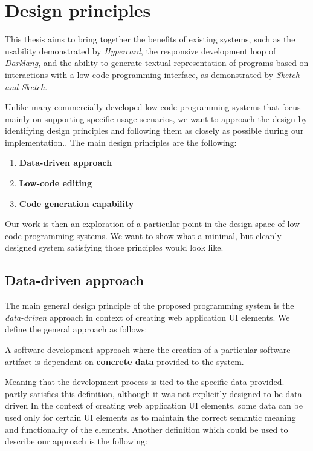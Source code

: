 \chapter{Design principles}
\label{chap:design}
This thesis aims to bring together the benefits of existing systems, such as the usability demonstrated by \emph{Hypercard},
the responsive development loop of  \emph{Darklang}, and the ability to generate textual representation of programs based on
interactions with a low-code programming interface, as demonstrated by \emph{Sketch-and-Sketch}.

Unlike many commercially developed low-code programming systems that focus mainly on supporting specific usage scenarios, we want to approach the design by identifying design principles and following them as closely as possible during our implementation..
The main design principles are the following:
\begin{enumerate}
	\item \textbf{Data-driven approach}
	\item \textbf{Low-code editing}
	\item \textbf{Code generation capability}
\end{enumerate}

Our work is then an exploration of a particular point in the design space of low-code programming systems.
We want to show what a minimal, but cleanly designed system satisfying those principles would look like.

\section{Data-driven approach}

The main general design principle of the proposed programming system is the \emph{data-driven} approach in context of creating web application UI elements.
We define the general approach as follows:
\begin{defn}
	A software development approach where the creation of a particular software artifact is dependant on \textbf{concrete data} provided to the system.
\end{defn}

Meaning that the development process is tied to the specific data provided.
\citet{darklang} partly satisfies this definition, although it was not explicitly designed to be data-driven
In the context of creating web application UI elements, some data can be used only for certain UI elements as to maintain the correct semantic meaning and functionality of the elements.
Another definition which could be used to describe our approach is the following:

